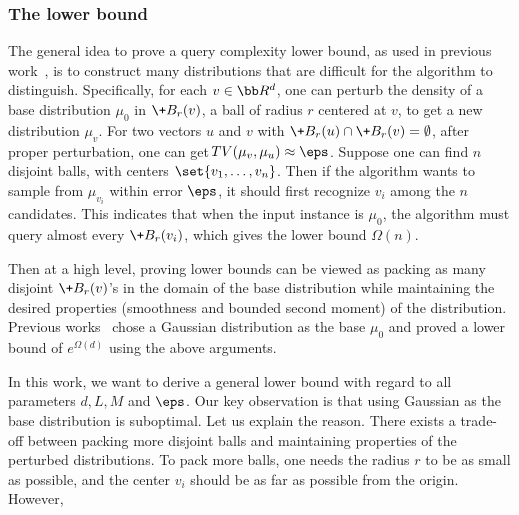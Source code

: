 \documentclass[11pt,a4paper]{article}
\newcommand{\DTV}{\!{TV}}
\begin{document}
\subsubsection{The lower bound}

The general idea to prove a query complexity lower bound, as used in previous work~\cite{GLR18,Cha24}, is to construct many distributions that are difficult for the algorithm to distinguish. Specifically, for each $v\in \bb R^d$, one can perturb the density of a base distribution $\mu_0$ in $\+B_r(v)$, a ball of radius $r$ centered at $v$, to get a new distribution $\mu_v$.  For two vectors $u$ and $v$ with $\+B_r(u)\cap \+B_r(v)=\emptyset$, after proper perturbation, one can get $\DTV(\mu_{v},\mu_u)\approx \eps$. Suppose one can find $n$ disjoint balls, with centers $\set{v_1,\dots,v_n}$. Then if the algorithm wants to sample from $\mu_{v_i}$ within error $\eps$, it should first recognize $v_i$ among the $n$ candidates. This indicates that when the input instance is $\mu_0$, the algorithm must query almost every $\+B_r(v_i)$, which gives the lower bound $\Omega(n)$.

Then at a high level, proving lower bounds can be viewed as packing as many disjoint $\+B_r(v)$'s in the domain of the base distribution while maintaining the desired properties (smoothness and bounded second moment) of the distribution. Previous works~\cite{GLR18,Cha24} 
chose a Gaussian distribution as the base $\mu_0$ and proved a lower bound of $e^{\Omega(d)}$ using the above arguments. 

In this work, we want to derive a general lower bound with regard to all parameters $d,L,M$ and $\eps$. Our key observation is that using Gaussian as the base distribution is suboptimal. Let us explain the reason.
There exists a trade-off between packing more disjoint balls and maintaining properties of the perturbed distributions. To pack more balls, one needs the radius $r$ to be as small as possible, and the center $v_i$ should be as far as possible from the origin. However,
\end{document}
